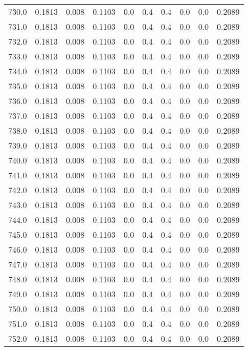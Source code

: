 \begin{longtable}{lrrrrrrrrr}
730.0 & 0.1813 & 0.008 & 0.1103 & 0.0 & 0.4 & 0.4 & 0.0 & 0.0 & 0.2089 \\
731.0 & 0.1813 & 0.008 & 0.1103 & 0.0 & 0.4 & 0.4 & 0.0 & 0.0 & 0.2089 \\
732.0 & 0.1813 & 0.008 & 0.1103 & 0.0 & 0.4 & 0.4 & 0.0 & 0.0 & 0.2089 \\
733.0 & 0.1813 & 0.008 & 0.1103 & 0.0 & 0.4 & 0.4 & 0.0 & 0.0 & 0.2089 \\
734.0 & 0.1813 & 0.008 & 0.1103 & 0.0 & 0.4 & 0.4 & 0.0 & 0.0 & 0.2089 \\
735.0 & 0.1813 & 0.008 & 0.1103 & 0.0 & 0.4 & 0.4 & 0.0 & 0.0 & 0.2089 \\
736.0 & 0.1813 & 0.008 & 0.1103 & 0.0 & 0.4 & 0.4 & 0.0 & 0.0 & 0.2089 \\
737.0 & 0.1813 & 0.008 & 0.1103 & 0.0 & 0.4 & 0.4 & 0.0 & 0.0 & 0.2089 \\
738.0 & 0.1813 & 0.008 & 0.1103 & 0.0 & 0.4 & 0.4 & 0.0 & 0.0 & 0.2089 \\
739.0 & 0.1813 & 0.008 & 0.1103 & 0.0 & 0.4 & 0.4 & 0.0 & 0.0 & 0.2089 \\
740.0 & 0.1813 & 0.008 & 0.1103 & 0.0 & 0.4 & 0.4 & 0.0 & 0.0 & 0.2089 \\
741.0 & 0.1813 & 0.008 & 0.1103 & 0.0 & 0.4 & 0.4 & 0.0 & 0.0 & 0.2089 \\
742.0 & 0.1813 & 0.008 & 0.1103 & 0.0 & 0.4 & 0.4 & 0.0 & 0.0 & 0.2089 \\
743.0 & 0.1813 & 0.008 & 0.1103 & 0.0 & 0.4 & 0.4 & 0.0 & 0.0 & 0.2089 \\
744.0 & 0.1813 & 0.008 & 0.1103 & 0.0 & 0.4 & 0.4 & 0.0 & 0.0 & 0.2089 \\
745.0 & 0.1813 & 0.008 & 0.1103 & 0.0 & 0.4 & 0.4 & 0.0 & 0.0 & 0.2089 \\
746.0 & 0.1813 & 0.008 & 0.1103 & 0.0 & 0.4 & 0.4 & 0.0 & 0.0 & 0.2089 \\
747.0 & 0.1813 & 0.008 & 0.1103 & 0.0 & 0.4 & 0.4 & 0.0 & 0.0 & 0.2089 \\
748.0 & 0.1813 & 0.008 & 0.1103 & 0.0 & 0.4 & 0.4 & 0.0 & 0.0 & 0.2089 \\
749.0 & 0.1813 & 0.008 & 0.1103 & 0.0 & 0.4 & 0.4 & 0.0 & 0.0 & 0.2089 \\
750.0 & 0.1813 & 0.008 & 0.1103 & 0.0 & 0.4 & 0.4 & 0.0 & 0.0 & 0.2089 \\
751.0 & 0.1813 & 0.008 & 0.1103 & 0.0 & 0.4 & 0.4 & 0.0 & 0.0 & 0.2089 \\
752.0 & 0.1813 & 0.008 & 0.1103 & 0.0 & 0.4 & 0.4 & 0.0 & 0.0 & 0.2089 \\

\end{longtable}
